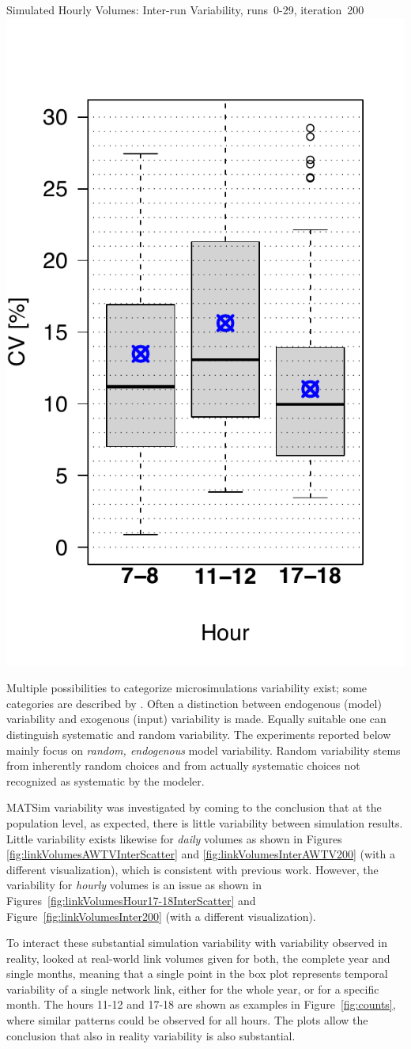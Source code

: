 {	{\label{fig:H1718}}%
  {}%
	\createsubfigure%
  {Simulated Hourly Volumes: Inter-run Variability, runs~0-29, iteration~200}%
	{\includegraphics[height=0.3\textwidth]{understanding/figures/var/linkVolumesInter200.pdf}}%
	{\label{fig:linkVolumesInter200}}%
  {}%
}%
{}

Multiple possibilities to categorize microsimulations variability exist; some categories are described by \citet[][]{HorniEtAl_TechRep_IVT_2011_b}. Often a distinction between endogenous (model) variability and exogenous (input) variability is made. Equally suitable one can distinguish systematic and random variability. The experiments reported below mainly focus on \emph{random, endogenous} model variability. Random variability stems from inherently random choices and from actually systematic choices not recognized as systematic by the modeler.

MATSim variability was investigated by \citet[][]{HorniEtAl_TechRep_IVT_2011_b, HorniEtAl_STRC_2011, Dayte_TechRep_IVT_2012} coming to the conclusion that at the population level, as expected, there is little variability between simulation results. Little variability exists likewise for \emph{daily} volumes as shown in Figures \ref{fig:linkVolumesAWTVInterScatter} and \ref{fig:linkVolumesInterAWTV200} (with a different visualization), which is consistent with previous work. However, the variability for \emph{hourly} volumes is an issue as shown in Figures~\ref{fig:linkVolumesHour17-18InterScatter} and Figure~\ref{fig:linkVolumesInter200} (with a different visualization).

To interact these substantial simulation variability with variability observed in reality, \citet[][]{HorniEtAl_STRC_2011} looked at real-world link volumes given for both, the complete year and single months, meaning that a single point in the box plot represents temporal variability of a single network link, either for the whole year, or for a specific month. The hours 11-12 and 17-18 are shown as examples in Figure~\ref{fig:counts}, where similar patterns could be observed for all hours. The plots allow the conclusion that also in reality variability is also substantial.

